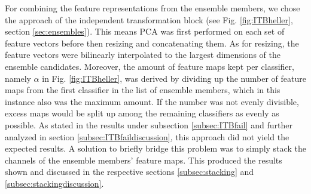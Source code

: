 For combining the feature representations from the ensemble members, we chose the approach of the independent transformation block (see Fig. \ref{fig:ITBheller}, section \ref{sec:ensembles}). This means 
PCA was first performed on each set of feature vectors before then resizing and concatenating them. As for resizing, 
the feature vectors were bilinearly interpolated to the largest dimensions of the ensemble candidates. Moreover, the amount of feature maps kept per classifier, namely $\alpha$ in Fig. \ref{fig:ITBheller}, 
was derived by dividing up the number of feature maps from the first classifier in the list of ensemble members, which in this instance also was the maximum amount. If the number 
was not evenly divisible, excess maps would be split up among the remaining classifiers as evenly as possible.\newline
As stated in the results under subsection \ref{subsec:ITBfail} and further analyzed in section \ref{subsec:ITBfaildiscussion}, this approach did not yield the expected results. 
A solution to briefly bridge this problem was to simply stack the channels of the ensemble members' feature maps. This produced the results shown and discussed in the respective 
sections \ref{subsec:stacking} and \ref{subsec:stackingdiscussion}.


